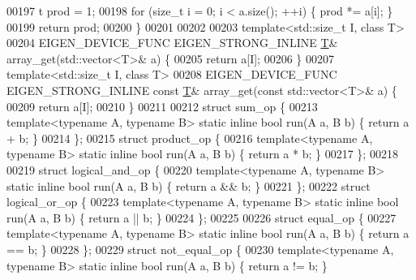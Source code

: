 \begin{DoxyCode}
00197   t prod = 1;
00198   \textcolor{keywordflow}{for} (\textcolor{keywordtype}{size\_t} i = 0; i < a.size(); ++i) \{ prod *= a[i]; \}
00199   \textcolor{keywordflow}{return} prod;
00200 \}
00201 
00202 
00203 \textcolor{keyword}{template}<std::\textcolor{keywordtype}{size\_t} I, \textcolor{keyword}{class} T>
00204 EIGEN\_DEVICE\_FUNC EIGEN\_STRONG\_INLINE \hyperlink{group___sparse_core___module_class_eigen_1_1_triplet}{T}& array\_get(std::vector<T>& a) \{
00205   \textcolor{keywordflow}{return} a[I];
00206 \}
00207 \textcolor{keyword}{template}<std::\textcolor{keywordtype}{size\_t} I, \textcolor{keyword}{class} T>
00208 EIGEN\_DEVICE\_FUNC EIGEN\_STRONG\_INLINE \textcolor{keyword}{const} \hyperlink{group___sparse_core___module_class_eigen_1_1_triplet}{T}& array\_get(\textcolor{keyword}{const} std::vector<T>& a) \{
00209   \textcolor{keywordflow}{return} a[I];
00210 \}
00211 
00212 \textcolor{keyword}{struct }sum\_op \{
00213   \textcolor{keyword}{template}<\textcolor{keyword}{typename} A, \textcolor{keyword}{typename} B> \textcolor{keyword}{static} \textcolor{keyword}{inline} \textcolor{keywordtype}{bool} run(A a, B b) \{ \textcolor{keywordflow}{return} a + b; \}
00214 \};
00215 \textcolor{keyword}{struct }product\_op \{
00216   \textcolor{keyword}{template}<\textcolor{keyword}{typename} A, \textcolor{keyword}{typename} B> \textcolor{keyword}{static} \textcolor{keyword}{inline} \textcolor{keywordtype}{bool} run(A a, B b) \{ \textcolor{keywordflow}{return} a * b; \}
00217 \};
00218 
00219 \textcolor{keyword}{struct }logical\_and\_op \{
00220   \textcolor{keyword}{template}<\textcolor{keyword}{typename} A, \textcolor{keyword}{typename} B> \textcolor{keyword}{static} \textcolor{keyword}{inline} \textcolor{keywordtype}{bool} run(A a, B b) \{ \textcolor{keywordflow}{return} a && b; \}
00221 \};
00222 \textcolor{keyword}{struct }logical\_or\_op \{
00223   \textcolor{keyword}{template}<\textcolor{keyword}{typename} A, \textcolor{keyword}{typename} B> \textcolor{keyword}{static} \textcolor{keyword}{inline} \textcolor{keywordtype}{bool} run(A a, B b) \{ \textcolor{keywordflow}{return} a || b; \}
00224 \};
00225 
00226 \textcolor{keyword}{struct }equal\_op \{
00227   \textcolor{keyword}{template}<\textcolor{keyword}{typename} A, \textcolor{keyword}{typename} B> \textcolor{keyword}{static} \textcolor{keyword}{inline} \textcolor{keywordtype}{bool} run(A a, B b) \{ \textcolor{keywordflow}{return} a == b; \}
00228 \};
00229 \textcolor{keyword}{struct }not\_equal\_op \{
00230   \textcolor{keyword}{template}<\textcolor{keyword}{typename} A, \textcolor{keyword}{typename} B> \textcolor{keyword}{static} \textcolor{keyword}{inline} \textcolor{keywordtype}{bool} run(A a, B b) \{ \textcolor{keywordflow}{return} a != b; \}

\end{DoxyCode}
